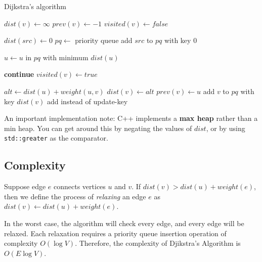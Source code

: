 \begin{algorithm}[H]
\caption{Dijkstra's algorithm}
\begin{algorithmic}

    \State $dist(v) \gets \infty$
    \State $prev(v) \gets -1$
    \State $visited(v) \gets false$
\EndFor

\State $dist(src) \gets 0$
\State $pq \gets$ priority queue
\State add $src$ to $pq$ with key $0$

    \State $u \gets u$ in $pq$ with minimum $dist(u)$
    
        \State \textbf{continue}
    \EndIf
    \State $visited(v) \gets true$

        \State $alt \gets dist(u) + weight(u, v)$
            \State $dist(v) \gets alt$
            \State $prev(v) \gets u$
            \State add $v$ to $pq$ with key $dist(v)$
            \Comment add instead of update-key
        \EndIf
    \EndFor
\EndWhile

\end{algorithmic}
\end{algorithm}

An important implementation note: C++ implements a \textbf{max heap} rather than a min heap. You can get around this by negating the values of $dist$, or by using \verb|std::greater| as the comparator.


\subsection{Complexity}

Suppose edge $e$ connects vertices $u$ and $v$. If $dist(v) > dist(u) + weight(e)$, then we define the process of \textit{relaxing} an edge $e$ as $dist(v) \gets dist(u) + weight(e)$.

In the worst case, the algorithm will check every edge, and every edge will be relaxed. Each relaxation requires a priority queue insertion operation of complexity $O(\log V)$. Therefore, the complexity of Djikstra's Algorithm is $O(E \log V)$.



